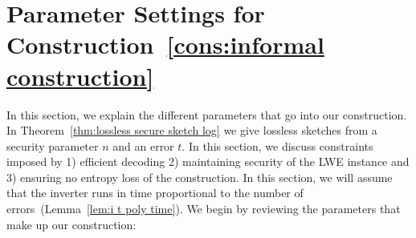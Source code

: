 \documentclass[11pt]{article}
\newcommand{\thref}[1]{\mbox{Theorem~\ref{#1}}}
\newcommand{\lemref}[1]{\mbox{Lemma~\ref{#1}}}
\newcommand{\consref}[1]{\mbox{Construction~\ref{#1}}}
\begin{document}
\section{Parameter Settings for \consref{cons:informal construction}}
\label{sec:parameter settings}
In this section, we explain the different parameters that go into our construction.  In \thref{thm:lossless secure sketch log} we give lossless sketches from a security parameter $n$ and an error $t$.  In this section, we discuss constraints imposed by 1) efficient decoding 2) maintaining security of the LWE instance and 3) ensuring no entropy loss of the construction.  In this section, we will assume that the inverter runs in time proportional to the number of errors~(\lemref{lem:i t poly time}).  We begin by reviewing the parameters that make up our construction:
\end{document}
